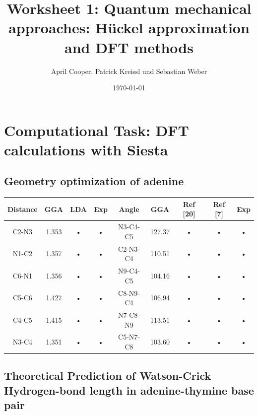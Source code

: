 \documentclass[12pt,a4paper]{scrartcl}
\author{April Cooper, Patrick Kreissl und Sebastian Weber}
\title{Worksheet 1: Quantum mechanical approaches:
Hückel approximation and DFT methods}
\date{\today}
\begin{document}
\maketitle
\tableofcontents
\newpage

\section{Computational Task: DFT calculations with Siesta}

\subsection{Geometry optimization of adenine}

\begin{tabular}{|c|c|c|c||c|c|c|c|c|}
\hline 
Distance & GGA & LDA & Exp & Angle & GGA & Ref [20] & Ref [7] & Exp \\ 
\hline 
C2-N3 & 1.353 & • & • & N3-C4-C5 & 127.37 & • & • & • \\ 
\hline 
N1-C2 & 1.357 & • & • & C2-N3-C4 & 110.51 & • & • & • \\ 
\hline 
C6-N1 & 1.356 & • & • & N9-C4-C5 & 104.16 & • & • & • \\ 
\hline 
C5-C6 & 1.427 & • & • & C8-N9-C4 & 106.94 & • & • & • \\ 
\hline 
C4-C5 & 1.415 & • & • & N7-C8-N9 & 113.51 & • & • & • \\ 
\hline 
N3-C4 & 1.351 & • & • & C5-N7-C8 & 103.60 & • & • & • \\ 
\hline 
\end{tabular} 

\newpage

\subsection{Theoretical Prediction of Watson-Crick Hydrogen-bond length in
adenine-thymine base pair}
\end{document}
